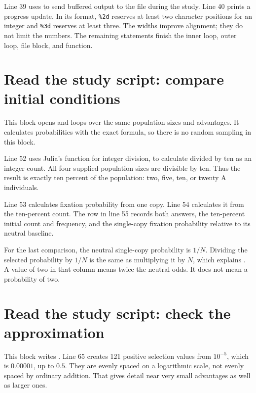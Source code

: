 Line 39 uses  to send buffered output to the file during the
study. Line 40 prints a progress update. In its format, \verb|%2d| reserves
at least two character positions for an integer and \verb|%3d| reserves
at least three. The widths improve alignment; they do not limit the numbers.
The remaining  statements finish the inner loop, outer loop,
file block, and function.

\section{Read the study script: compare initial conditions}



This block opens  and loops over the same
population sizes and advantages. It calculates probabilities with the exact
formula, so there is no random sampling in this block.

Line 52 uses Julia's  function for integer division,
to calculate  divided by ten as an integer count. All four supplied
population sizes are divisible by ten. Thus the result is exactly ten percent
of the population: two, five, ten, or twenty A individuals.

Line 53 calculates fixation probability from one copy. Line 54 calculates
it from the ten-percent count. The row in line 55 records both answers,
the ten-percent initial count and frequency, and the single-copy fixation
probability relative to its neutral baseline.

For the last comparison, the neutral single-copy probability is \(1/N\).
Dividing the selected probability by \(1/N\) is the same as multiplying
it by \(N\), which explains . A value of two in that
column means twice the neutral odds. It does not mean a probability of two.

\section{Read the study script: check the approximation}



This block writes . Line 65 creates 121 positive
selection values from \(10^{-5}\), which is \(0.00001\), up to \(0.5\).
They are evenly spaced on a logarithmic scale, not evenly spaced by ordinary
addition. That gives detail near very small advantages as well as larger ones.


